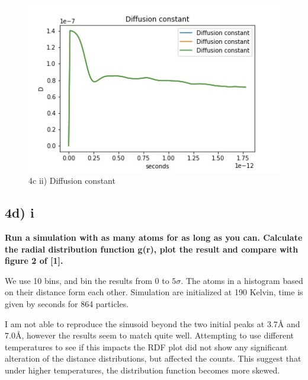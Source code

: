 \documentclass[a4paper,10pt,english]{article}
\begin{document}
\begin{figure}[h!]
        \centering 
        \includegraphics[scale=0.6]{./py/img/4c_ii_diffusionConstant.jpg} 
        \caption{4c ii) Diffusion constant }
        \label{fig:4cii_diffusionconstant}
\end{figure}

\subsection{4d) i}
\textbf{Run a simulation with as many atoms for as long as you can. Calculate the radial distribution
function g(r), plot the result and compare with figure 2 of [1].}

We use 10 bins, and bin the results from $0$ to $5\sigma$. The atoms in a histogram based on their distance form each other. Simulation are initialized at 190 Kelvin, time is given by  $ $seconds for 864 particles. 

I am not able to reproduce the sinusoid beyond the two initial peaks at $3.7Å$ and $7.0 Å$, however the results seem to match quite well. Attempting to use different temperatures to see if this impacts the RDF plot did not show any significant alteration of the distance distributions, but affected the counts. This suggest that under higher temperatures, the distribution function becomes more skewed. 
\end{document}

